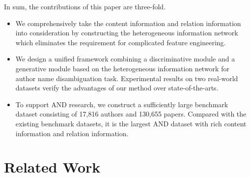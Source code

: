 \documentclass[letterpaper]{article}
\begin{document}
In sum, the contributions of this paper are three-fold.
\begin{itemize}
\item We comprehensively take the content information and relation information into consideration by constructing the heterogeneous information network which eliminates the requirement for complicated feature engineering.
\item We design a unified framework combining a discriminative module and a generative module based on the heterogeneous information network for author name disambiguation task.
Experimental results on two real-world datasets verify the advantages of our method over state-of-the-arts.
\item To support AND research, we construct a sufficiently large benchmark dataset consisting of 17,816 authors and 130,655 papers. Compared with the existing benchmark datasets, it is the largest AND dataset with rich content information and relation information.
\end{itemize}

\section{Related Work}
\end{document}
